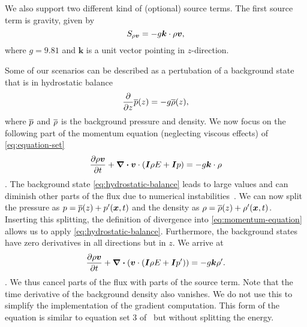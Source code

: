 We also support two different kind of (optional) source terms.
The first source term is gravity, given by
\begin{equation}\label{eq:source-gravity}
  \source[\Qj] = - g \bm{k} \cdot \Qj,
\end{equation}
where $g = 9.81$ and $\bm{k}$ is a unit vector pointing in $z$-direction.

\newcommand{\backgroundPressure}{\overline{\pressure}}
\newcommand{\backgroundRho}{\overline{\Qrho}}
Some of our scenarios can be described as a pertubation of a background state that is in hydrostatic balance
\begin{equation}
  \label{eq:hydrostatic-balance}
  \pdv{}{z} \backgroundPressure{\left (z \right )} = -g \backgroundRho(z),
\end{equation}
where $\backgroundPressure$ and $\backgroundRho$ is the background pressure and density.
We now focus on the following part of the momentum equation (neglecting viscous effects) of \cref{eq:equation-set}
\begin{equation}
  \label{eq:momentum-equation}
  \pdv{\Qj}{t}+ \divergence{
    \Qv \cdot \left( \bm{I} \QE + \bm{I} \pressure \right)
  }
  =
  -g \bm{k} \cdot \Qrho
\end{equation}.
The background state \cref{eq:hydrostatic-balance} leads to large values and can diminish other parts of the flux due to numerical instabilities~\cite{muller2010adaptive}.
We can now split the pressure as $\pressure = \backgroundPressure(z) + \pressure' (\bm{x}, t)$ and the density as $\Qrho = \backgroundRho(z) + \Qrho'(\bm{x}, t)$.
Inserting this splitting, the definition of divergence into \cref{eq:momentum-equation} allows us to apply \cref{eq:hydrostatic-balance}.
Furthermore, the background states have zero derivatives in all directions but in $z$.
We arrive at 
\begin{equation}
  \label{eq:momentum-equation}
  \pdv{\Qj}{t}+ \divergence \left(
    \Qv \cdot \left( \bm{I} \QE + \bm{I} \pressure' \right)
   \right)
  =
  -g \bm{k} \Qrho'.
\end{equation}.
We thus cancel parts of the flux with parts of the source term.
Note that the time derivative of the background density also vanishes.
We do not use this to simplify the implementation of the gradient computation.
This form of the equation is similar to equation set 3 of~\cite{giraldo2008study} but without splitting the energy.

